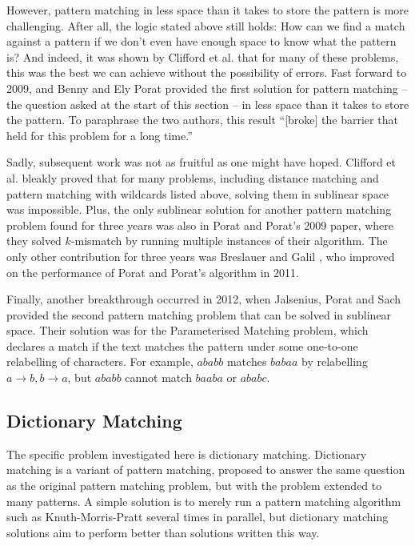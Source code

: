 \documentclass[ %
                    author={Dominic Joseph Moylett},
                    degree={MEng},
                     title={Dictionary Matching with Fingerprints},
                  subtitle={An Empirical Analysis},
                      type={research},
                      year={2015} ]{dissertation}
\begin{document}
However, pattern matching in less space than it takes to store the pattern is more challenging. After all, the logic stated above still holds: How can we find a match against a pattern if we don't even have enough space to know what the pattern is? And indeed, it was shown by Clifford et al.\@ \cite{clifford:black-box} that for many of these problems, this was the best we can achieve without the possibility of errors. Fast forward to 2009, and Benny and Ely Porat \cite{5438620} provided the first solution for pattern matching -- the question asked at the start of this section -- in less space than it takes to store the pattern. To paraphrase the two authors, this result ``[broke] the barrier that held for this problem for a long time.''

Sadly, subsequent work was not as fruitful as one might have hoped. Clifford et al.\@ \cite{DBLP:journals/corr/abs-1106-4412} bleakly proved that for many problems, including distance matching and pattern matching with wildcards listed above, solving them in sublinear space was impossible. Plus, the only sublinear solution for another pattern matching problem found for three years was also in Porat and Porat's 2009 paper, where they solved $k$-mismatch by running multiple instances of their algorithm. The only other contribution for three years was Breslauer and Galil \cite{Breslauer:2014:RSS:2660854.2635814}, who improved on the performance of Porat and Porat's algorithm in 2011.

Finally, another breakthrough occurred in 2012, when Jalsenius, Porat and Sach \cite{JPS:2013} provided the second pattern matching problem that can be solved in sublinear space. Their solution was for the Parameterised Matching problem, which declares a match if the text matches the pattern under some one-to-one relabelling of characters. For example, $ababb$ matches $babaa$ by relabelling $a \to b, b \to a$, but $ababb$ cannot match $baaba$ or $ababc$.

\subsection{Dictionary Matching}

The specific problem investigated here is dictionary matching. Dictionary matching is a variant of pattern matching, proposed to answer the same question as the original pattern matching problem, but with the problem extended to many patterns. A simple solution is to merely run a pattern matching algorithm such as Knuth-Morris-Pratt several times in parallel, but dictionary matching solutions aim to perform better than solutions written this way.
\end{document}
